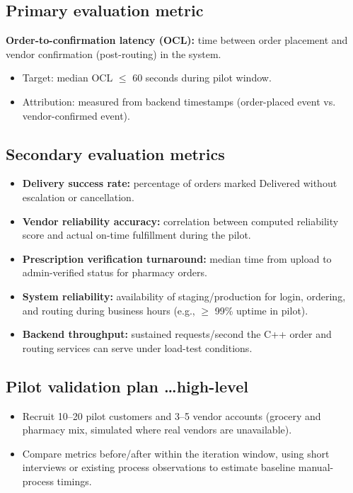 \documentclass{article}
\begin{document}
\subsection{Primary evaluation metric}
\textbf{Order-to-confirmation latency (OCL):} time between order placement and vendor
confirmation (post-routing) in the system.
\begin{itemize}
    \item Target: median OCL $\leq$ 60 seconds during pilot window.
    \item Attribution: measured from backend timestamps (order-placed event vs.
    vendor-confirmed event).
\end{itemize}

\subsection{Secondary evaluation metrics}
\begin{itemize}
    \item \textbf{Delivery success rate:} percentage of orders marked Delivered without
    escalation or cancellation.
    \item \textbf{Vendor reliability accuracy:} correlation between computed reliability score
    and actual on-time fulfillment during the pilot.
    \item \textbf{Prescription verification turnaround:} median time from upload to
    admin-verified status for pharmacy orders.
    \item \textbf{System reliability:} availability of staging/production for login, ordering,
    and routing during business hours (e.g., $\geq$ 99\% uptime in pilot).
    \item \textbf{Backend throughput:} sustained requests/second the C++ order and routing
    services can serve under load-test conditions.
\end{itemize}

\subsection{Pilot validation plan \dots high-level}
\begin{itemize}
    \item Recruit 10--20 pilot customers and 3--5 vendor accounts (grocery and pharmacy mix,
    simulated where real vendors are unavailable).
    \item Compare metrics before/after within the iteration window, using short interviews or
    existing process observations to estimate baseline manual-process timings.
\end{itemize}
\end{document}
